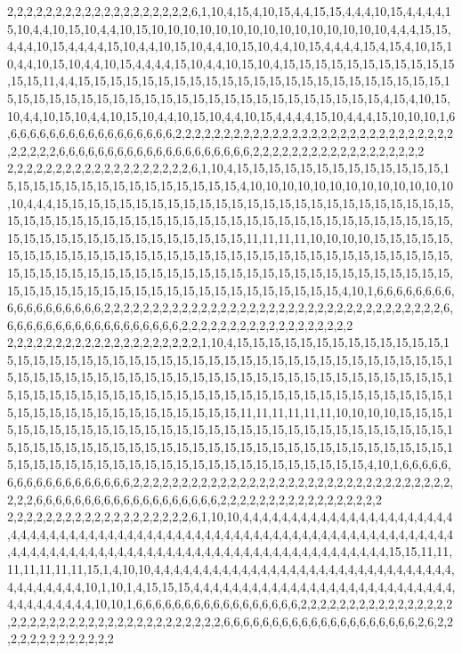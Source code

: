2,2,2,2,2,2,2,2,2,2,2,2,2,2,2,2,2,2,2,6,1,10,4,15,4,10,15,4,4,15,15,4,4,4,10,15,4,4,4,4,15,10,4,4,10,15,10,4,4,10,15,10,10,10,10,10,10,10,10,10,10,10,10,10,10,10,4,4,4,15,15,4,4,4,10,15,4,4,4,4,15,10,4,4,10,15,10,4,4,10,15,10,4,4,10,15,4,4,4,4,15,4,15,4,10,15,10,4,4,10,15,10,4,4,10,15,4,4,4,4,15,10,4,4,10,15,10,4,15,15,15,15,15,15,15,15,15,15,15,15,15,11,4,4,15,15,15,15,15,15,15,15,15,15,15,15,15,15,15,15,15,15,15,15,15,15,15,15,15,15,15,15,15,15,15,15,15,15,15,15,15,15,15,15,15,15,15,15,15,15,15,4,15,4,10,15,10,4,4,10,15,10,4,4,10,15,10,4,4,10,15,10,4,4,10,15,4,4,4,4,15,10,4,4,4,15,10,10,10,1,6,6,6,6,6,6,6,6,6,6,6,6,6,6,6,6,6,6,2,2,2,2,2,2,2,2,2,2,2,2,2,2,2,2,2,2,2,2,2,2,2,2,2,2,2,2,2,2,2,2,2,2,6,6,6,6,6,6,6,6,6,6,6,6,6,6,6,6,6,6,6,6,2,2,2,2,2,2,2,2,2,2,2,2,2,2,2,2,2,2
2,2,2,2,2,2,2,2,2,2,2,2,2,2,2,2,2,2,2,6,1,10,4,15,15,15,15,15,15,15,15,15,15,15,15,15,15,15,15,15,15,15,15,15,15,15,15,15,15,15,15,4,10,10,10,10,10,10,10,10,10,10,10,10,10,10,4,4,4,15,15,15,15,15,15,15,15,15,15,15,15,15,15,15,15,15,15,15,15,15,15,15,15,15,15,15,15,15,15,15,15,15,15,15,15,15,15,15,15,15,15,15,15,15,15,15,15,15,15,15,15,15,15,15,15,15,15,15,15,15,15,15,15,15,15,15,15,11,11,11,11,10,10,10,10,15,15,15,15,15,15,15,15,15,15,15,15,15,15,15,15,15,15,15,15,15,15,15,15,15,15,15,15,15,15,15,15,15,15,15,15,15,15,15,15,15,15,15,15,15,15,15,15,15,15,15,15,15,15,15,15,15,15,15,15,15,15,15,15,15,15,15,15,15,15,15,15,15,15,15,15,15,15,15,15,15,15,4,10,1,6,6,6,6,6,6,6,6,6,6,6,6,6,6,6,6,6,6,2,2,2,2,2,2,2,2,2,2,2,2,2,2,2,2,2,2,2,2,2,2,2,2,2,2,2,2,2,2,2,2,2,2,2,6,6,6,6,6,6,6,6,6,6,6,6,6,6,6,6,6,6,6,2,2,2,2,2,2,2,2,2,2,2,2,2,2,2,2,2,2
2,2,2,2,2,2,2,2,2,2,2,2,2,2,2,2,2,2,2,2,1,10,4,15,15,15,15,15,15,15,15,15,15,15,15,15,15,15,15,15,15,15,15,15,15,15,15,15,15,15,15,15,15,15,15,15,15,15,15,15,15,15,15,15,15,15,15,15,15,15,15,15,15,15,15,15,15,15,15,15,15,15,15,15,15,15,15,15,15,15,15,15,15,15,15,15,15,15,15,15,15,15,15,15,15,15,15,15,15,15,15,15,15,15,15,15,15,15,15,15,15,15,15,15,15,15,15,15,15,15,15,15,15,15,15,11,11,11,11,11,11,10,10,10,10,15,15,15,15,15,15,15,15,15,15,15,15,15,15,15,15,15,15,15,15,15,15,15,15,15,15,15,15,15,15,15,15,15,15,15,15,15,15,15,15,15,15,15,15,15,15,15,15,15,15,15,15,15,15,15,15,15,15,15,15,15,15,15,15,15,15,15,15,15,15,15,15,15,15,15,15,15,15,15,15,15,15,4,10,1,6,6,6,6,6,6,6,6,6,6,6,6,6,6,6,6,6,6,2,2,2,2,2,2,2,2,2,2,2,2,2,2,2,2,2,2,2,2,2,2,2,2,2,2,2,2,2,2,2,2,2,2,2,2,6,6,6,6,6,6,6,6,6,6,6,6,6,6,6,6,6,6,6,2,2,2,2,2,2,2,2,2,2,2,2,2,2,2,2,2
2,2,2,2,2,2,2,2,2,2,2,2,2,2,2,2,2,2,2,6,1,10,10,4,4,4,4,4,4,4,4,4,4,4,4,4,4,4,4,4,4,4,4,4,4,4,4,4,4,4,4,4,4,4,4,4,4,4,4,4,4,4,4,4,4,4,4,4,4,4,4,4,4,4,4,4,4,4,4,4,4,4,4,4,4,4,4,4,4,4,4,4,4,4,4,4,4,4,4,4,4,4,4,4,4,4,4,4,4,4,4,4,4,4,4,4,4,4,4,4,4,4,4,4,4,4,4,4,4,4,15,15,11,11,11,11,11,11,11,15,1,4,10,10,4,4,4,4,4,4,4,4,4,4,4,4,4,4,4,4,4,4,4,4,4,4,4,4,4,4,4,4,4,4,4,4,4,4,4,4,4,4,4,10,1,10,1,4,15,15,15,4,4,4,4,4,4,4,4,4,4,4,4,4,4,4,4,4,4,4,4,4,4,4,4,4,4,4,4,4,4,4,4,4,4,4,4,10,10,1,6,6,6,6,6,6,6,6,6,6,6,6,6,6,6,6,6,2,2,2,2,2,2,2,2,2,2,2,2,2,2,2,2,2,2,2,2,2,2,2,2,2,2,2,2,2,2,2,2,2,2,2,2,2,2,6,6,6,6,6,6,6,6,6,6,6,6,6,6,6,6,6,6,6,6,2,6,2,2,2,2,2,2,2,2,2,2,2,2,2
